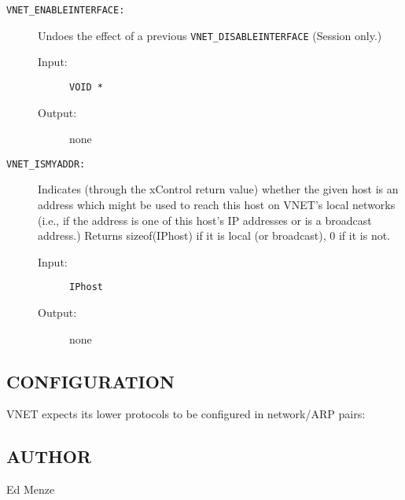 \begin{description}
\item[{\tt VNET\_ENABLEINTERFACE:}]
Undoes the effect of a previous {\tt VNET\_DISABLEINTERFACE}
(Session only.)

\begin{description}
\item[{\rm Input:}] { \tt VOID * }
\item[{\rm Output:}] none
\end{description}


\item[{\tt VNET\_ISMYADDR:}]

Indicates (through the xControl return value) whether the given host
is an address which might be used to reach this host on VNET's local
networks (i.e., if the address is one of this host's IP addresses or
is a broadcast address.)
Returns sizeof(IPhost) if it is local (or broadcast), 0 if it is not.

\begin{description}
\item[{\rm Input:}] {\tt IPhost}
\item[{\rm Output:}] none
\end{description}


\end{description}

\subsection*{CONFIGURATION}

VNET expects its lower protocols to be configured in network/ARP
pairs:


\subsection*{AUTHOR}

\noindent Ed Menze
